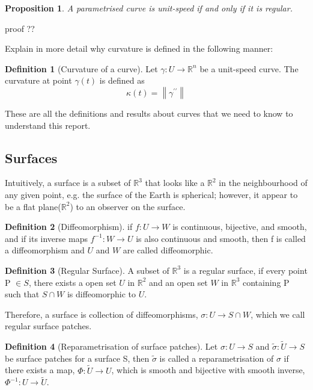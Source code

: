 \documentclass{article}
\theoremstyle{plain}
\newtheorem{proposition}{Proposition}
\theoremstyle{definition}
\newtheorem{definition}{Definition}
\theoremstyle{remark}
\newcommand{\R}{\mathbb{R}}
\begin{document}
\begin{proposition}
    A parametrised curve is unit-speed if and only if it is regular.
\end{proposition}
{\color{red} proof ??}

{\color{red} Explain in more detail why curvature is defined in the following manner: }
\begin{definition}[Curvature of a curve] \label{definition: Curvature of a curve}
    Let \( \gamma: U \rightarrow \R^n \) be a unit-speed curve. The curvature at point \( \gamma(t) \) is defined as \[ \kappa(t) = \left\lVert \gamma^{\prime\prime} \right\rVert  \]
\end{definition}

These are all the definitions and results about curves that we need to know to understand this report.
\subsection{Surfaces}
Intuitively, a surface is a subset of \( \R^3 \) that looks like a \( \R^2 \)  in the neighbourhood of any given point, e.g. the surface of the Earth is spherical; however, it appear to be a flat plane(\( \R^2 \)) to an observer on the surface.

\begin{definition}[Diffeomorphism]
    if \( f: U \rightarrow W \) is continuous, bijective, and smooth, and if its inverse maps \( f^{-1}: W \rightarrow U\) is also continuous and smooth, then f is called a diffeomorphism and \(U\) and \(W\) are called diffeomorphic.
\end{definition}

\begin{definition}[Regular Surface]
    A subset of \( \R^3 \) is a regular surface, if every point P \( \in S \), there exists a open set \( U \text{ in } \R^2\) and an open set \( W \text{ in } \R^3\) containing P such that \( S \cap W\) is diffeomorphic to \(U\).
\end{definition}
Therefore, a surface is collection of diffeomorphisms, \( \sigma: U \rightarrow S \cap W \), which we call regular surface patches.

\begin{definition}[Reparametrisation of surface patches]
    Let \( \sigma: U \rightarrow S\) and \( \tilde{\sigma}: \tilde{U} \rightarrow S\) be surface patches for a surface S, then \( \tilde{\sigma} \) is called a reparametrisation of \( \sigma \) if there exists a map, \( \Phi: \tilde{U} \rightarrow U \), which is smooth and bijective with smooth inverse, \( \Phi^{-1}: U \rightarrow \tilde{U} \).
\end{definition}
\end{document}
